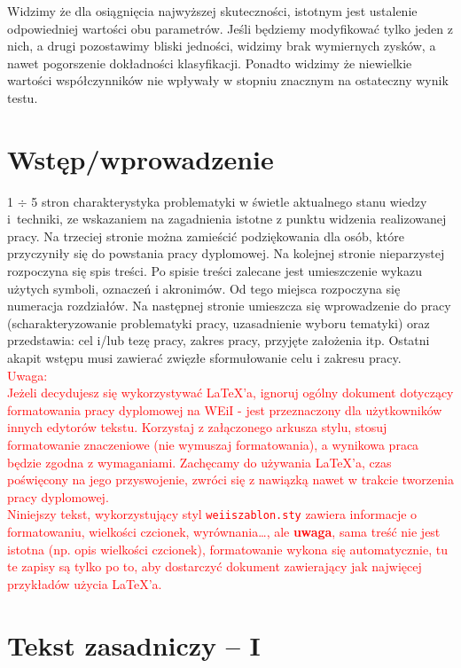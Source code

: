 \documentclass[12pt,twoside]{article}
\begin{document}
Widzimy że dla osiągnięcia najwyższej skuteczności, istotnym jest ustalenie odpowiedniej wartości obu parametrów.
Jeśli będziemy modyfikować tylko jeden z nich, a drugi pozostawimy bliski jedności, widzimy brak wymiernych zysków, a nawet pogorszenie dokładności klasyfikacji.
Ponadto widzimy że niewielkie wartości współczynników nie wpływały w stopniu znacznym na ostateczny wynik testu.

\clearpage

\section{Wstęp/wprowadzenie}
1 $\div$ 5 stron charakterystyka problematyki w świetle aktualnego stanu wiedzy i~techniki, ze wskazaniem na zagadnienia istotne z punktu widzenia realizowanej pracy.
Na trzeciej stronie można zamieścić podziękowania dla osób, które przyczyniły się do powstania pracy dyplomowej. Na kolejnej stronie nieparzystej rozpoczyna się spis treści. Po spisie treści zalecane jest umieszczenie wykazu użytych symboli, oznaczeń i akronimów. Od tego miejsca rozpoczyna się numeracja rozdziałów. Na następnej stronie umieszcza się wprowadzenie do pracy (scharakteryzowanie problematyki pracy, uzasadnienie wyboru tematyki) oraz przedstawia: cel i/lub tezę pracy, zakres pracy, przyjęte założenia itp.
Ostatni akapit wstępu musi zawierać zwięzłe sformułowanie celu i zakresu pracy. 
\\
\textcolor{red}{
Uwaga: \\
Jeżeli decydujesz się wykorzystywać \LaTeX'a, ignoruj ogólny dokument dotyczący formatowania pracy dyplomowej na WEiI - jest przeznaczony dla użytkowników innych edytorów tekstu. Korzystaj z załączonego arkusza stylu, stosuj formatowanie znaczeniowe (nie wymuszaj formatowania), a wynikowa praca będzie zgodna z wymaganiami. Zachęcamy do używania \LaTeX'a, czas poświęcony na jego przyswojenie, zwróci się z nawiązką nawet w trakcie tworzenia pracy dyplomowej. \\
Niniejszy tekst, wykorzystujący  styl \texttt{weiiszablon.sty} zawiera informacje o formatowaniu, wielkości czcionek, wyrównania\ldots, ale \textbf{uwaga}, sama treść nie jest istotna (np. opis wielkości czcionek), 
formatowanie wykona się automatycznie, tu te zapisy są tylko po to, aby dostarczyć dokument zawierający jak najwięcej przykładów użycia \LaTeX'a.
}

\clearpage

\section{Tekst zasadniczy -- I}
\end{document}
